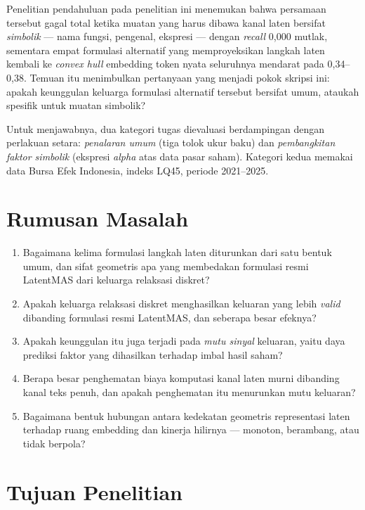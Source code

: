 \documentclass{laporanta1statugm}
\begin{document}
Penelitian pendahuluan pada penelitian ini menemukan bahwa persamaan tersebut
gagal total ketika muatan yang harus dibawa kanal laten bersifat
\textit{simbolik} --- nama fungsi, pengenal, ekspresi --- dengan
\textit{recall} 0,000 mutlak, sementara empat formulasi alternatif yang
memproyeksikan langkah laten kembali ke \textit{convex hull} embedding token
nyata seluruhnya mendarat pada 0,34--0,38. Temuan itu menimbulkan pertanyaan
yang menjadi pokok skripsi ini: apakah keunggulan keluarga formulasi
alternatif tersebut bersifat umum, ataukah spesifik untuk muatan simbolik?

Untuk menjawabnya, dua kategori tugas dievaluasi berdampingan dengan
perlakuan setara: \textit{penalaran umum} (tiga tolok ukur baku) dan
\textit{pembangkitan faktor simbolik} (ekspresi \textit{alpha} atas data pasar
saham). Kategori kedua memakai data Bursa Efek Indonesia, indeks LQ45, periode
2021--2025.

\section{Rumusan Masalah}

\begin{enumerate}
  \item Bagaimana kelima formulasi langkah laten diturunkan dari satu bentuk
        umum, dan sifat geometris apa yang membedakan formulasi resmi LatentMAS
        dari keluarga relaksasi diskret?
  \item Apakah keluarga relaksasi diskret menghasilkan keluaran yang lebih
        \textit{valid} dibanding formulasi resmi LatentMAS, dan seberapa besar
        efeknya?
  \item Apakah keunggulan itu juga terjadi pada \textit{mutu sinyal} keluaran,
        yaitu daya prediksi faktor yang dihasilkan terhadap imbal hasil saham?
  \item Berapa besar penghematan biaya komputasi kanal laten murni dibanding
        kanal teks penuh, dan apakah penghematan itu menurunkan mutu keluaran?
  \item Bagaimana bentuk hubungan antara kedekatan geometris representasi laten
        terhadap ruang embedding dan kinerja hilirnya --- monoton, berambang,
        atau tidak berpola?
\end{enumerate}

\section{Tujuan Penelitian}
\end{document}
